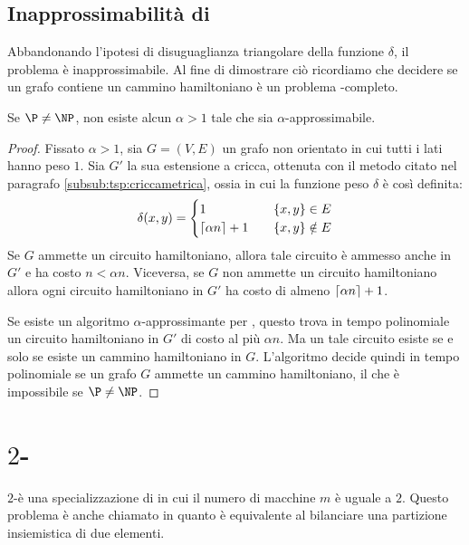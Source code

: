 \subsection{Inapprossimabilità di \TravelingSalesman}
Abbandonando l'ipotesi di disuguaglianza triangolare della funzione $\delta$, il problema \TravelingSalesman è inapprossimabile.
Al fine di dimostrare ciò ricordiamo che decidere se un grafo contiene un cammino hamiltoniano è un problema \NP-completo.

\begin{theorem}
	Se $\P\neq\NP$, non esiste alcun $\alpha>1$ tale che \TravelingSalesman sia $\alpha$-approssimabile.
\end{theorem}
\begin{proof}
	Fissato $\alpha>1$, sia $G=(V,E)$ un grafo non orientato in cui tutti i lati hanno peso $1$.
	Sia $G'$ la sua estensione a cricca, ottenuta con il metodo citato nel paragrafo \ref{subsub:tsp:criccametrica}, ossia in cui la funzione peso $\delta$ è così definita:
	\begin{equation*}
		\delta(x,y) = \begin{cases}
			1                 & \quad \left\{ x,y \right\}\in E    \\
			\left\lceil \alpha n \right\rceil+1 & \quad \left\{ x,y \right\}\notin E
		\end{cases}
	\end{equation*}
	Se $G$ ammette un circuito hamiltoniano, allora tale circuito è ammesso anche in $G'$ e ha costo $n<\alpha n$.
	Viceversa, se $G$ non ammette un circuito hamiltoniano allora ogni circuito hamiltoniano in $G'$ ha costo di almeno $\left\lceil \alpha n \right\rceil+1$.

	Se esiste un algoritmo $\alpha$-approssimante per \TravelingSalesman, questo trova in tempo polinomiale un circuito hamiltoniano in $G'$ di costo al più $\alpha n$. Ma un tale circuito esiste se e solo se esiste un cammino hamiltoniano in $G$. L'algoritmo decide quindi in tempo polinomiale se un grafo $G$ ammette un cammino hamiltoniano, il che è impossibile se $\P\neq\NP$.
\end{proof}



\section{\texorpdfstring{$2$}{2}-\LoadBalancing}
$2$-\LoadBalancing è una specializzazione di \LoadBalancing in cui il numero di macchine $m$ è uguale a $2$.
Questo problema è anche chiamato \MinimumPartition in quanto è equivalente al bilanciare una partizione insiemistica di due elementi.


